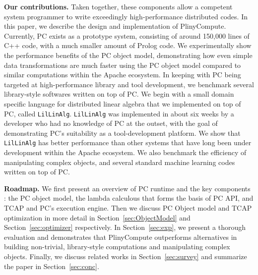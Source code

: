 \vspace{5 pt}
\noindent
\textbf{Our contributions.}
Taken together, these components allow a competent system programmer to write exceedingly high-performance distributed codes.
In this paper, we describe the design and implementation of PlinyCompute.  Currently, PC exists as a prototype system, consisting of around
150,000 lines of C++ code, with a much smaller amount of Prolog code. We experimentally show the performance benefits of the PC object model, 
demonstrating how even simple data transformations are much faster using the PC object model compared to similar computations within the 
Apache ecosystem.
In keeping with PC being targeted at high-performance
library and tool development,
we benchmark several library-style softwares written on top of PC.  We begin with a small domain specific language
for distributed linear algebra that we implemented on top of PC, called \texttt{LilLinAlg}.  \texttt{LilLinAlg} was implemented in about six weeks by a developer
who had no knowledge of PC at the outset, with the goal of demonstrating PC's suitability as a tool-development platform.  
We show that \texttt{LilLinAlg} has better performance than other systems that have long been under development
within the Apache ecosystem.   
We also benchmark the efficiency of manipulating complex objects, and
several standard machine learning codes written on top of PC.  

\vspace{5 pt}
\noindent
\textbf{Roadmap.} We first present an overview of PC runtime and the key components
: the PC object model, the lambda calculous that
forms the basis of PC API, 
and TCAP and PC's execution engine. Then we discuss PC Object model
and TCAP optimization
in more detail in Section~\ref{sec:ObjectModel}  and
Section~\ref{sec:optimizer} respectively. In
Section~\ref{sec:exp}, we present a thorough 
evaluation and demonstrates that PlinyCompute outperforms alternatives
in building non-trivial, library-style computations  and manipulating
complex objects. Finally, we discuss related works in
Section~\ref{sec:survey} and summarize the paper in Section~\ref{sec:conc}.
